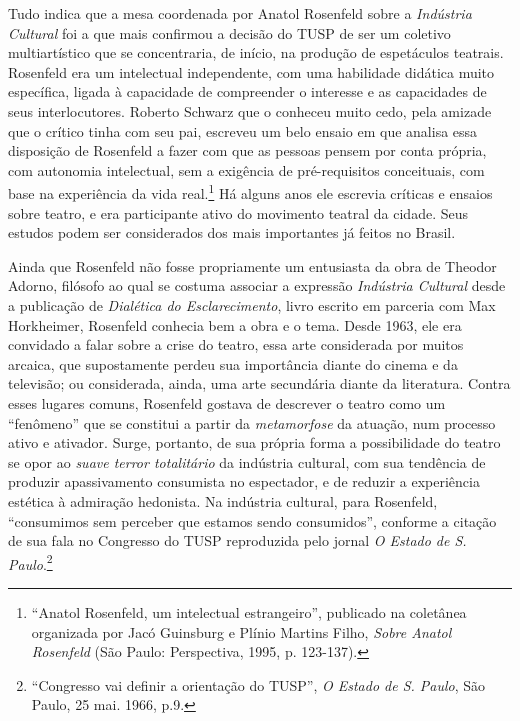 Tudo indica que a mesa coordenada por Anatol Rosenfeld sobre a
\textit{Indústria Cultural} foi a que mais confirmou a decisão do TUSP de
ser um coletivo multiartístico que se concentraria, de início, na
produção de espetáculos teatrais. Rosenfeld era um intelectual
independente, com uma habilidade didática muito específica, ligada à
capacidade de compreender o interesse e as capacidades de seus
interlocutores. Roberto Schwarz que o conheceu muito cedo, pela amizade
que o crítico tinha com seu pai, escreveu um belo ensaio em que analisa
essa disposição de Rosenfeld a fazer com que as pessoas pensem por conta
própria, com autonomia intelectual, sem a exigência de pré-requisitos
conceituais, com base na experiência da vida real.\footnote{“Anatol
  Rosenfeld, um intelectual estrangeiro”, publicado na coletânea
  organizada por Jacó Guinsburg e Plínio Martins Filho, \textit{Sobre
  Anatol Rosenfeld} (São Paulo: Perspectiva, 1995, p. 123-137).} Há
alguns anos ele escrevia críticas e ensaios sobre teatro, e era
participante ativo do movimento teatral da cidade. Seus estudos podem
ser considerados dos mais importantes já feitos no Brasil.

Ainda que Rosenfeld não fosse propriamente um entusiasta da obra de
Theodor Adorno, filósofo ao qual se costuma associar a expressão
\textit{Indústria Cultural} desde a publicação de \textit{Dialética do
Esclarecimento}, livro escrito em parceria com Max Horkheimer, Rosenfeld
conhecia bem a obra e o tema. Desde 1963, ele era convidado a falar
sobre a crise do teatro, essa arte considerada por muitos arcaica, que
supostamente perdeu sua importância diante do cinema e da televisão; ou
considerada, ainda, uma arte secundária diante da literatura. Contra
esses lugares comuns, Rosenfeld gostava de descrever o teatro como um
“fenômeno” que se constitui a partir da \textit{metamorfose} da atuação,
num processo ativo e ativador. Surge, portanto, de sua própria forma a
possibilidade do teatro se opor ao \textit{suave terror totalitário} da
indústria cultural, com sua tendência de produzir apassivamento
consumista no espectador, e de reduzir a experiência estética à
admiração hedonista. Na indústria cultural, para Rosenfeld, “consumimos
sem perceber que estamos sendo consumidos”, conforme a citação de sua
fala no Congresso do TUSP reproduzida pelo jornal \textit{O Estado de S.
Paulo}.\footnote{“Congresso vai definir a orientação do TUSP”, \textit{O
  Estado de S. Paulo}, São Paulo, 25 mai. 1966, p.9.}

